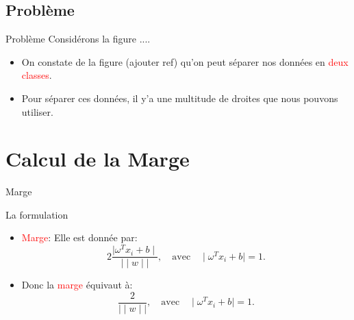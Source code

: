 \documentclass[10pt]{beamer}
\begin{document}
\subsection*{Probl\`eme}

{
\begin{frame}{Problème}
  Consid\'erons la figure ....
\begin{itemize}
	\item On constate de la figure (ajouter ref)  qu'on peut s\'eparer nos donn\'ees en \textcolor{red}{deux classes}.
	\item Pour s\'eparer ces donn\'ees, il y'a une multitude de droites que nous pouvons utiliser. 
\end{itemize}
\end{frame}}

{
\section{Calcul de la Marge}
\begin{frame}{Marge}
  \begin{block}{La formulation}
  \begin{itemize}
     \item \textcolor{red}{Marge}: Elle est donn\'ee par:
     \textcolor{green!10!blue}{	
		\begin{equation}
		2\frac{ \mid \omega^{T}x_{i}+b \mid}{\mid\mid w \mid\mid}, \quad \text{avec}\quad \mid \omega^{T}x_{i}+b \mid=1.
		\end{equation}}
	\item Donc la \textcolor{red}{marge} \'equivaut \`a:
	\textcolor{green!10!blue}{	
		\begin{equation}
		\frac{2}{\mid\mid w \mid\mid}, \quad \text{avec}\quad \mid \omega^{T}x_{i}+b \mid=1.
		\end{equation}}
  \end{itemize}
  \end{block}
\end{frame}}
\end{document}
